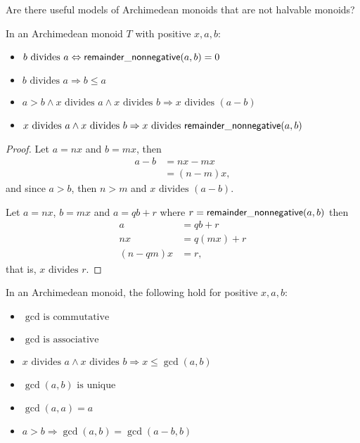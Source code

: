 \begin{project}
	Are there useful models of Archimedean monoids that are not halvable monoids?
\end{project}

\begin{lemma}
	In an Archimedean monoid $T$ with positive $x, a, b$:
	\begin{itemize}
		\item $b \text{ divides } a \Leftrightarrow \mathsf{remainder\_nonnegative}(a, b) = 0$
		\item $b \text{ divides } a \Rightarrow b \leq a$
		\item $a > b \wedge x \text{ divides } a \wedge x \text{ divides } b \Rightarrow x \text{ divides } (a - b)$
		\item $x \text{ divides } a \wedge x \text{ divides } b \Rightarrow x \text{ divides } \mathsf{remainder\_nonnegative}(a, b)$
	\end{itemize}
\end{lemma}

\begin{proof}
	Let $a = nx$ and $b = mx$, then
	\begin{align*}
		a - b &= nx - mx\\
		      &= (n - m)x,
	\end{align*}
	and since $a > b$, then $n > m$ and $x \text{ divides } (a - b)$.

	Let $a = nx$, $b = mx$ and $a = qb + r$ where $r = \mathsf{remainder\_nonnegative}(a, b)$ then
	\begin{align*}
		a &= qb + r\\
		nx &= q(mx) + r\\
		(n - qm)x &= r,
	\end{align*}
	that is, $x \text{ divides } r$.
\end{proof}

\begin{lemma}
	In an Archimedean monoid, the following hold for positive $x, a, b$:
	\begin{itemize}
		\item $\gcd \text{ is commutative}$
		\item $\gcd \text{ is associative}$ 
		\item $x \text{ divides } a \wedge x \text{ divides } b \Rightarrow x \leq \gcd(a, b)$
		\item $\gcd(a, b) \text{ is unique}$
		\item $\gcd(a, a) = a$
		\item $a > b \Rightarrow \gcd(a, b) = \gcd(a - b, b)$
	\end{itemize}
\end{lemma}

